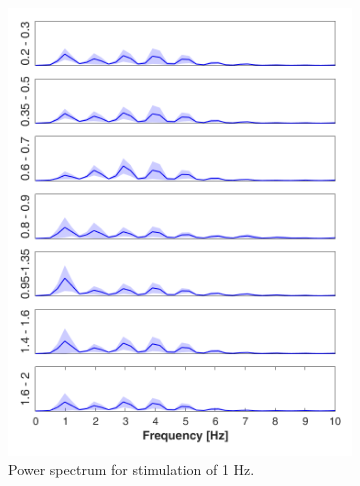 \documentclass{pracalicmgr}
\begin{document}
	\begin{figure}[H]
	\begin{subfigure}{.5\textwidth}
		\centering
		\includegraphics[width=1.\linewidth]{widmo_1Hz.png}
		\caption{Power spectrum for stimulation of 1 Hz.}
		\label{rys:widmo_1Hz}
	\end{subfigure}%
	\begin{subfigure}{.5\textwidth}
		\centering

\end{subfigure}
\end{figure}
\end{document}
